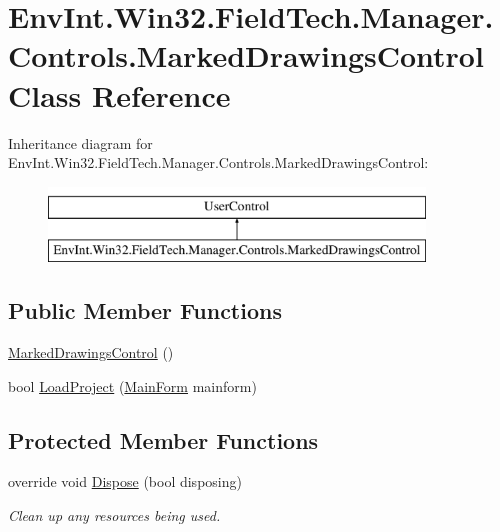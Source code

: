 \hypertarget{class_env_int_1_1_win32_1_1_field_tech_1_1_manager_1_1_controls_1_1_marked_drawings_control}{}\section{Env\+Int.\+Win32.\+Field\+Tech.\+Manager.\+Controls.\+Marked\+Drawings\+Control Class Reference}
\label{class_env_int_1_1_win32_1_1_field_tech_1_1_manager_1_1_controls_1_1_marked_drawings_control}
Inheritance diagram for Env\+Int.\+Win32.\+Field\+Tech.\+Manager.\+Controls.\+Marked\+Drawings\+Control\+:\begin{figure}[H]
\begin{center}
\leavevmode
\includegraphics[height=2.000000cm]{class_env_int_1_1_win32_1_1_field_tech_1_1_manager_1_1_controls_1_1_marked_drawings_control}
\end{center}
\end{figure}
\subsection*{Public Member Functions}
\begin{DoxyCompactItemize}
\item 
\hyperlink{class_env_int_1_1_win32_1_1_field_tech_1_1_manager_1_1_controls_1_1_marked_drawings_control_a986788a8a81c3edaeb44f042e2345cf8}{Marked\+Drawings\+Control} ()
\item 
bool \hyperlink{class_env_int_1_1_win32_1_1_field_tech_1_1_manager_1_1_controls_1_1_marked_drawings_control_ad79c0eafbc77c61a4e813f0eab9180b2}{Load\+Project} (\hyperlink{class_env_int_1_1_win32_1_1_field_tech_1_1_manager_1_1_main_form}{Main\+Form} mainform)
\end{DoxyCompactItemize}
\subsection*{Protected Member Functions}
\begin{DoxyCompactItemize}
\item 
override void \hyperlink{class_env_int_1_1_win32_1_1_field_tech_1_1_manager_1_1_controls_1_1_marked_drawings_control_a93783dfe03bd6399d72ae7a692abf08c}{Dispose} (bool disposing)
\begin{DoxyCompactList}\small\item\em Clean up any resources being used. \end{DoxyCompactList}\end{DoxyCompactItemize}


